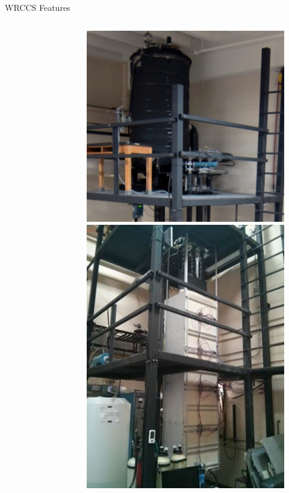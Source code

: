 \documentclass[10pt,t,xcolor=table]{UWMadBeamer}
\begin{document}
\begin{frame}{WRCCS Features}
\begin{columns}
\begin{column}{0.71\paperwidth}
{\begin{figure}
                \end{figure}
            }
        \end{column}
        \hfill
        \begin{column}{0.28\paperwidth}
            \begin{figure}
                \centering
                \includegraphics[keepaspectratio,height=0.35\paperheight]{WRCCS_Tank}\\
                \includegraphics[keepaspectratio,height=0.35\paperheight]{WRCCS_HeaterBox}
            \end{figure}
        \end{column}
    \end{columns}
\end{frame}
\end{document}
